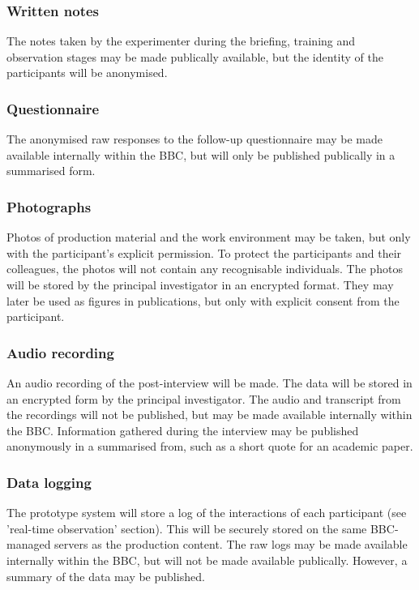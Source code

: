 \subsubsection{Written notes}
The notes taken by the experimenter during the briefing, training and
observation stages may be made publically available, but the identity of the
participants will be anonymised.

\subsubsection{Questionnaire}
The anonymised raw responses to the follow-up questionnaire may be made
available internally within the BBC, but will only be published publically in a
summarised form.

\subsubsection{Photographs}
Photos of production material and the work environment may be taken, but only
with the participant's explicit permission. To protect the participants and
their colleagues, the photos will not contain any recognisable individuals. The
photos will be stored by the principal investigator in an encrypted format.
They may later be used as figures in publications, but only with explicit
consent from the participant.

\subsubsection{Audio recording}
An audio recording of the post-interview will be made. The data will be stored
in an encrypted form by the principal investigator. The audio and transcript
from the recordings will not be published, but may be made available internally
within the BBC. Information gathered during the interview may be published
anonymously in a summarised from, such as a short quote for an academic paper.

\subsubsection{Data logging}
The prototype system will store a log of the interactions of each participant
(see 'real-time observation' section). This will be securely stored on the same
BBC-managed servers as the production content. The raw logs may be made
available internally within the BBC, but will not be made available publically.
However, a summary of the data may be published.

